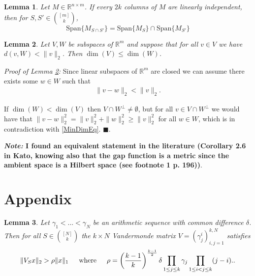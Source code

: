 \documentclass[journal,onecolumn]{IEEEtran}
\newtheorem{lemma}{Lemma}
\begin{document}

\begin{lemma}\label{SpanIntersectionLemma}
Let $M \in \mathbb{R}^{n \times m}$. If every $2k$ columns of $M$ are linearly independent, then for $S,S' \in {[m] \choose k}$,
\begin{equation}
\text{Span}\{M_{S \cap S'}\} = \text{Span}\{M_{S}\} \cap \text{Span}\{M_{S'}\}
\end{equation}
\end{lemma}


\begin{lemma}\label{MinimalDimensionLemma}
Let $V,W$ be subspaces of $\mathbb{R}^m$ and suppose that for all $v \in V$ we have $d(v, W) < \|v\|_2$. Then $\dim(V) \leq  \dim(W)$.
\end{lemma}

\emph{Proof of Lemma \ref{MinimalDimensionLemma}:} Since linear subspaces of $\mathbb{R}^m$ are closed we can assume there exists some $w \in W$ such that
\begin{align}\label{MinDimEq}
\|v - w\|_2 < \|v\|_2.
\end{align}

If $\dim(W) < \dim(V)$ then $V \cap W^\perp \neq \emptyset$, but for all $v \in V \cap W^\perp$ we would have that $\|v - w\|_2^2 = \|v\|_2^2 + \|w\|_2^2 \geq \|v\|_2^2$ for all $w \in W$, which is in contradiction with \eqref{MinDimEq}. \indent $\blacksquare$.

\textbf{\emph{Note:} I found an equivalent statement in the literature (Corollary 2.6 in Kato, knowing also that the gap function is a metric since the ambient space is a Hilbert space (see footnote 1 p. 196))}.


\section{Appendix}


\begin{lemma}\label{MatrixLowerBoundLemma}
Let $\gamma_1 < ... < \gamma_N$ be an arithmetic sequence with common difference $\delta$. Then for all $S \in {[N] \choose k}$ the $k \times N$ Vandermonde matrix $V = (\gamma^i_j)^{k,N}_{i,j=1}$ satisfies 
\begin{align}
	\|V_S x\|_2 > \rho \|x\|_1 \indent \text{where} \indent \rho = \left( \frac{k-1}{k} \right)^\frac{k-1}{2} \delta \prod_{1 \leq j \leq k } \gamma_j \prod_{1 \leq i < j \leq k} (j-i)..
\end{align}
\end{lemma}
\end{document}
